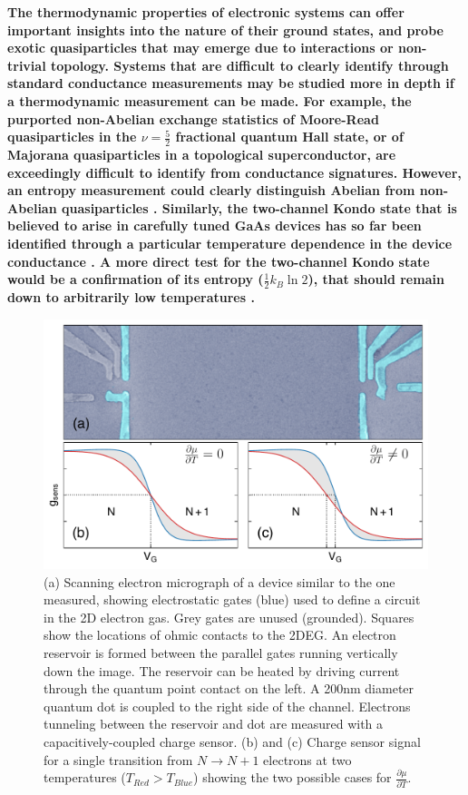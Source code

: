 \documentclass[twocolumn,showpacs,preprintnumbers,amsmath,amssymb,pra,aps,superscriptaddress]{revtex4-1}
\begin{document}
\textbf{The thermodynamic properties of electronic systems can offer important insights into the nature of their ground states, and probe exotic quasiparticles that may emerge due to interactions or non-trivial topology.  Systems that are difficult to clearly identify through standard conductance measurements may be studied more in depth if a thermodynamic measurement can be made. For example, the purported non-Abelian exchange statistics of Moore-Read quasiparticles in the $\nu = \frac{5}{2}$ fractional quantum Hall state, or of Majorana quasiparticles in a topological superconductor, are exceedingly difficult to identify from conductance signatures. However, an entropy measurement could clearly distinguish Abelian from non-Abelian quasiparticles \cite{Cooper2009, Smirnov2015}.  Similarly, the two-channel Kondo state that is believed to arise in carefully tuned GaAs devices has so far been identified through a particular temperature dependence in the device conductance \cite{Potok2007}. A more direct test for the two-channel Kondo state would be a confirmation of its entropy ($\frac{1}{2} k_B \ln{2}$), that should remain down to arbitrarily low temperatures \cite{Alkurtass2016}.}

\begin{figure}[!]
        \includegraphics[width=1.0\columnwidth]{../figures/figure_1_no-annotation.pdf}
        \caption{\label{fig:fig1}(a) Scanning electron micrograph of a device similar to the one measured, showing electrostatic gates (blue) used to define a circuit in the 2D electron gas. Grey gates are unused (grounded). Squares show the locations of ohmic contacts to the 2DEG. An electron reservoir is formed between the parallel gates running vertically down the image. The reservoir can be heated by driving current through the quantum point contact on the left. A 200nm diameter quantum dot is coupled to the right side of the channel. Electrons tunneling between the reservoir and dot are measured with a capacitively-coupled charge sensor. (b) and (c) Charge sensor signal for a single transition from $N \rightarrow N+1$ electrons at two temperatures ($T_{Red} > T_{Blue}$) showing the two possible cases for $\frac{\partial \mu}{\partial T}$.}
\end{figure}
\end{document}
